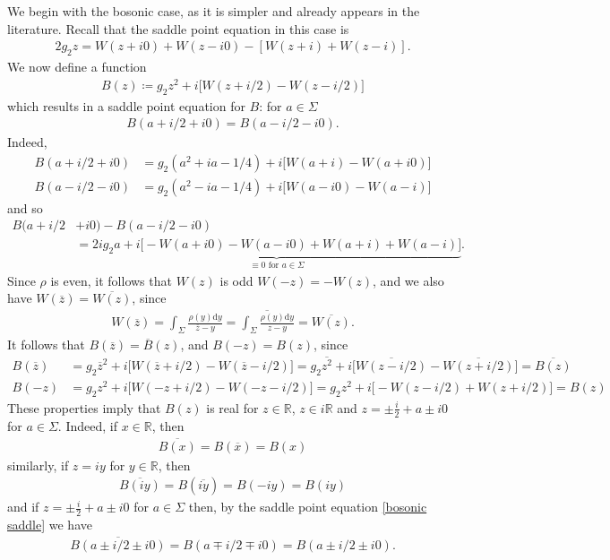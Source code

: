 \documentclass[10pt]{article}
\newcommand{\rr}{\mathbb{R}}
\newcommand{\dif}{\mathrm{d}}
\theoremstyle{plain}
\theoremstyle{definition}
\theoremstyle{plain}
\begin{document}
We begin with the bosonic case, as it is simpler and already appears in the literature. Recall that the saddle point equation in this case is 
\begin{align*}
	2g_2 z = W(z+i0) + W(z-i0) - [W(z+i) + W(z-i)].
\end{align*}
We now define a function
\begin{align*}
	B(z) \coloneqq g_2 z^2 + i \bigg[W(z+i/2)-W(z-i/2)\bigg]
\end{align*}
which results in a saddle point equation for $B$: for $a\in\Sigma$
\begin{align*}
	B(a+i/2 + i0) = B(a-i/2-i0).
\end{align*}
Indeed,
\begin{align*}
	B(a+ i/2+i0) &=  g_2(a^2+ia-1/4) +i\bigg[W(a+i)-W(a+i0)\bigg] \\
	B(a-i/2-i0)  &= g_2(a^2 - ia - 1/4) +i\bigg[W(a-i0)-W(a-i)\bigg] 
\end{align*}
and so 
\begin{align*}
	B(a+i/2&+i0)-B(a-i/2-i0)\\ &= \underbrace{2ig_2a + i\bigg[-W(a+i0)-W(a-i0)+W(a+i)+W(a-i)\bigg]}_{\equiv 0\text{ for $a\in\Sigma$}}.
\end{align*}
Since $\rho$ is even, it follows that $W(z)$ is odd $W(-z)=-W(z)$, and we also have $W(\overline{z})=\overline{W(z)}$, since
\begin{align*}
	W(\overline{z})=\int_\Sigma \frac{\rho(y)\dif y}{\overline{z}-y} = \overline{\int_\Sigma \frac{\rho(y)\dif y}{z-y}}=\overline{W(z)}.
\end{align*}
It follows that $B(\overline{z})=\overline{B}(z)$, and $B(-z)=B(z)$, since
\begin{align*}
	B(\overline{z}) &= g_2\overline{z}^2 + i\bigg[W(\overline{z}+i/2)-W(\overline{z}-i/2)\bigg]= g_2\overline{z^2} + i\bigg[\overline{W(z-i/2)}-\overline{W(z+i/2)}\bigg] = \overline{B(z)} \\
	B(-z) &= g_2z^2 +i\bigg[W(-z+i/2)-W(-z-i/2)\bigg] = g_2z^2 +i\bigg[-W(z-i/2)+W(z+i/2)\bigg]=B(z)
\end{align*}
These properties imply that $B(z)$ is real for $z\in \rr$, $z\in i\rr$ and $z=\pm\frac{i}{2}+a\pm i0$ for $a\in \Sigma$. Indeed, if $x\in \rr$, then
\begin{align*}
	\overline{B(x)} = B(\overline{x})=B(x)
\end{align*}
similarly, if $z=iy$ for $y \in \rr$, then
\begin{align*}
	\overline{B(iy)}=B(\overline{iy})=B(-iy)=B(iy)
\end{align*}
and if $z=\pm\frac{i}{2}+a\pm i0$ for $a\in \Sigma$ then, by the saddle point equation \ref{bosonic saddle} we have
\begin{align*}
	\overline{B(a\pm i/2 \pm i0)} = B(a \mp i/2 \mp i0) = B(a \pm i/2 \pm i0).
\end{align*}
\end{document}

